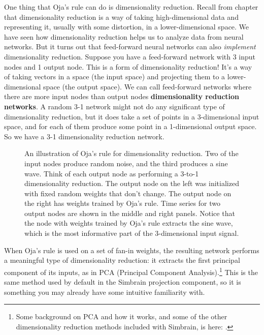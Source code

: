 One thing that Oja's rule can do is dimensionality reduction. Recall from chapter  that dimensionality reduction is a way of taking high-dimensional data and representing it, usually with some distortion, in a lower-dimensional space. We have seen how dimensionality reduction helps us to analyze data from neural networks. But it turns out that feed-forward neural networks can also \emph{implement} dimensionality reduction. Suppose you have a feed-forward network with 3 input nodes and 1 output node. This is a form of dimensionality reduction!  It's a way of taking vectors in a space (the input space) and projecting them to a lower-dimensional space (the output space). We can call feed-forward networks where there are more input nodes than output nodes \textbf{dimensionality reduction networks}. A random 3-1 network might  not do any significant type of dimensionality reduction, but it does take a set of points in a 3-dimensional input space, and for each of them produce some point in a 1-dimensional output space. So we have a 3-1 dimensionality reduction network. 

\begin{figure}[h]
\centering
{}
\caption[Simbrain screenshot]{An illustration of Oja's rule for dimensionality reduction. Two of the input nodes produce random noise, and the third produces a sine wave. Think of each output node as performing a 3-to-1 dimensionality reduction. The output node on the left was initialized with fixed random weights that don't change. The output node on the right has weights trained by Oja's rule. Time series for two output nodes are shown in the middle and right panels. Notice that the node with weights trained by Oja's rule extracts the sine wave, which is the most informative part of the 3-dimensional input signal.}
\label{oja_dim_reduction}
\end{figure}

When Oja's rule is used on a set of fan-in weights, the resulting network performs a meaningful type of dimensionality reduction: it extracts the first principal component of its inputs, as in PCA (Principal Component Analysis).\footnote{Some background on PCA and how it works, and some of the other dimensionality reduction methods included with Simbrain, is here: .}   This is the same method used by default in the Simbrain projection component, so it is something you may already have some intuitive familiarity with. 


